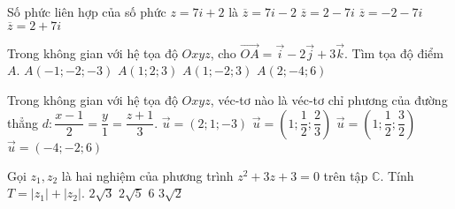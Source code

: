 \begin{ex}%
	Số phức liên hợp của số phức $z=7i+2$ là
	\choice
	{$\overline{z}=7i-2$}
	{\True $\overline{z}=2-7i$}
	{$\overline{z}=-2-7i$}
	{$\overline{z}=2+7i$}
\end{ex}
\begin{ex}%
	Trong không gian với hệ tọa độ $Oxyz$, cho $\overrightarrow{OA}=\vec{i}-2\vec{j}+3\vec{k}$. Tìm tọa độ điểm $A$.
	\choice
	{$A\left(-1;-2;-3\right)$}
	{$A\left(1;2;3\right)$}
	{\True $A\left(1;-2;3\right)$}
	{$A\left(2;-4;6\right)$}
\end{ex}
\begin{ex}%
	Trong không gian với hệ tọa độ $Oxyz$, véc-tơ nào là véc-tơ chỉ phương của đường thẳng $d\colon \dfrac{x-1}{2}=\dfrac{y}{1}=\dfrac{z+1}{3}$.
	\choice
	{$\vec{u}=\left(2;1;-3\right)$}
	{$\vec{u}=\left(1;\dfrac{1}{2};\dfrac{2}{3}\right)$}
	{\True $\vec{u}=\left(1;\dfrac{1}{2};\dfrac{3}{2}\right)$}
	{$\vec{u}=\left(-4;-2;6\right)$}
\end{ex}
\begin{ex}%
	Gọi $z_1,z_2$ là hai nghiệm của phương trình $z^2+3z+3=0$ trên tập $\mathbb{C}$. Tính $T=\left|z_1\right|+\left|z_2\right|$.
	\choice
	{\True $2\sqrt{3}$}
	{$2\sqrt{5}$}
	{$6$}
	{$3\sqrt{2}$}
\end{ex}
